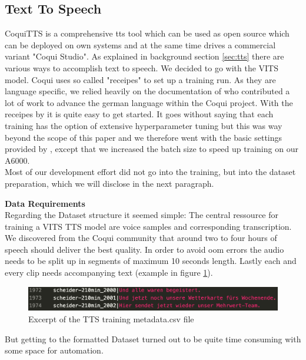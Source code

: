 \documentclass[
  a4paper,  %
  twoside,  %
  bibliography=totoc,
  headsepline,
  cleardoublepage=empty,
  parskip=half,
  draft=false
]{scrbook}
\begin{document}
\subsection{Text To Speech}
CoquiTTS is a comprehensive \gls*{tts} tool which can be used as open source which can be deployed on own systems and at the same time drives a commercial variant "Coqui Studio". As explained in background section \ref{sec:tts} there are various ways to accomplish text to speech. We decided to go with the VITS model. Coqui uses so called "receipes" to set up a training run. As they are language specific, we relied heavily on the documentation of  who contributed a lot of work to advance the german language within the Coqui project.
With the receipes by  it is quite easy to get started. It goes without saying that each training has the option of extensive hyperparameter tuning but this was way beyond the scope of this paper and we therefore went with the basic settings provided by , except that we increased the batch size to speed up training on our A6000. \\
Most of our development effort did not go into the training, but into the dataset preparation, which we will disclose in the next paragraph.

\textbf{Data Requirements} \\
Regarding the Dataset structure it seemed simple: The central ressource for training a VITS TTS model are voice samples and corresponding transcription. We discovered from the Coqui community that around two to four hours of speech should deliver the best quality. In order to avoid \gls{oom} errors the audio needs to be split up in segments of maximum 10 seconds length. Lastly each and every clip needs accompanying text (example in figure \ref{fig:metadata.csv}).
\begin{figure}[h]
  \centering
  \includegraphics[width=1\textwidth]{./graphics/images/tts/csv.png}
  \caption{Excerpt of the TTS training metadata.csv file}
  \label{fig:metadata.csv}
\end{figure}
But getting to the formatted Dataset turned out to be quite time consuming with some space for automation.
\end{document}
